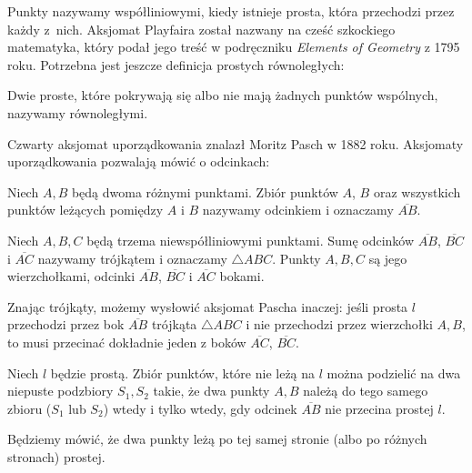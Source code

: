 {Punkty nazywamy współliniowymi, kiedy istnieje prosta, która przechodzi przez każdy z~nich.
Aksjomat Playfaira został nazwany na cześć szkockiego matematyka, który podał jego treść w podręczniku \emph{Elements of Geometry} z 1795 roku.
%
%
Potrzebna jest jeszcze definicja prostych równoległych:

\begin{definition}[równoległość]
	Dwie proste, które pokrywają się albo nie mają żadnych punktów wspólnych, nazywamy równoległymi.
\end{definition}

Czwarty aksjomat uporządkowania znalazł Moritz Pasch \cite{pasch_1882} w 1882 roku.
Aksjomaty uporządkowania pozwalają mówić o odcinkach:

\begin{definition}[odcinek]
%
	Niech $A, B$ będą dwoma różnymi punktami.
	Zbiór punktów $A$, $B$ oraz wszystkich punktów leżących pomiędzy $A$ i $B$ nazywamy odcinkiem i oznaczamy $\overline{AB}$.
\end{definition}

\begin{definition}[trójkąt]
%
%
%
	Niech $A, B, C$ będą trzema niewspółliniowymi punktami.
	Sumę odcinków $\overline{AB}$, $\overline{BC}$ i $\overline{AC}$ nazywamy trójkątem i oznaczamy $\triangle ABC$.
	Punkty $A, B, C$ są jego wierzchołkami, odcinki $\overline{AB}$, $\overline{BC}$ i $\overline{AC}$ bokami.
\end{definition}

Znając trójkąty, możemy wysłowić aksjomat Pascha inaczej: jeśli prosta $l$ przechodzi przez bok $\overline{AB}$ trójkąta $\triangle ABC$ i nie przechodzi przez wierzchołki $A, B$, to musi przecinać dokładnie jeden z boków $\overline{AC}$, $\overline{BC}$.

\begin{proposition}
	Niech $l$ będzie prostą.
	Zbiór punktów, które nie leżą na $l$ można podzielić na dwa niepuste podzbiory $S_1, S_2$ takie, że dwa punkty $A, B$ należą do tego samego zbioru ($S_1$ lub $S_2$) wtedy i tylko wtedy, gdy odcinek $\overline{AB}$ nie przecina prostej $l$.
\end{proposition}

Będziemy mówić, że dwa punkty leżą po tej samej stronie (albo po różnych stronach) prostej.

}
